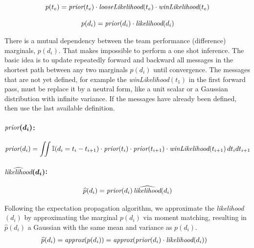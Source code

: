 \documentclass[article]{jss}
\begin{document}
\begin{equation}
 p(t_e) = \emph{prior}(t_e) \cdot \emph{looseLikelihood}(t_e) \cdot \emph{winLikelihood}(t_e)
\end{equation}

\begin{equation}
 p(d_i) = \emph{prior}(d_i) \cdot \emph{likelihood}(d_i)
\end{equation}

There is a mutual dependency between the team performance (difference) marginals, $p(d_i)$.
That makes impossible to perform a one shot inference.
The basic idea is to update repeatedly forward and backward all messages in the shortest path between any two marginals $p(d_i)$ until convergence.
The messages that are not yet defined, for example the \emph{winLikelihood}$(t_1)$ in the first forward pass, must be replace it by a neutral form, like a unit scalar or a Gaussian distribution with infinite variance.
If the messages have already been defined, then use the last available definition.

\paragraph{$\bm{\emph{prior}(d_i)}$:}

\begin{equation}
 \begin{split}
  \emph{prior}(d_{i}) = \iint \mathbb{I}(d_{i} = t_i - t_{i+1} ) \cdot \emph{prior}(t_i) \cdot \emph{prior}(t_{i+1}) \cdot \emph{winLikelihood}(t_{i+1}) \, dt_idt_{i+1}
 \end{split}
\end{equation}


\paragraph{$\bm{\widehat{\emph{likelihood}}(d_i)}$:}

\begin{equation}
\widehat{p}(d_i) = \emph{prior}(d_i) \, \widehat{\emph{likelihood}}(d_i)
\end{equation}

Following the expectation propagation algorithm, we approximate the \emph{likelihood}$(d_i)$ by approximating the marginal $p(d_i)$ via moment matching, resulting in $\widehat{p}(d_i)$ a Gaussian with the same mean and variance as $p(d_i)$.
\begin{equation}
\begin{split}
 \widehat{p}(d_i) & = \emph{approx}(p(d_i)) = \emph{approx}(\emph{prior}(d_i) \cdot \emph{likelihood}(d_i))
 \end{split}
\end{equation}
\end{document}
